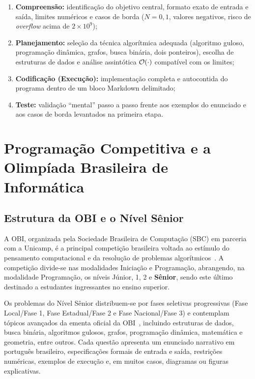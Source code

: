 \begin{enumerate}
    \item \textbf{Compreensão:} identificação do objetivo central, formato exato de entrada e saída, limites numéricos e casos de borda ($N = 0, 1$, valores negativos, risco de \textit{overflow} acima de $2 \times 10^9$);
    \item \textbf{Planejamento:} seleção da técnica algorítmica adequada (algoritmo guloso, programação dinâmica, grafos, busca binária, dois ponteiros), escolha de estruturas de dados e análise assintótica $\mathcal{O}\!\left(\cdot\right)$ compatível com os limites;
    \item \textbf{Codificação (Execução):} implementação completa e autocontida do programa dentro de um bloco Markdown delimitado;
    \item \textbf{Teste:} validação ``mental'' passo a passo frente aos exemplos do enunciado e aos casos de borda levantados na primeira etapa.
\end{enumerate}

\section{Programação Competitiva e a Olimpíada Brasileira de Informática}\label{sec:fund-obi}

\subsection{Estrutura da OBI e o Nível Sênior}\label{sec:fund-obi-senior}

A OBI, organizada pela Sociedade Brasileira de Computação (SBC) em parceria com a Unicamp, é a principal competição brasileira voltada ao estímulo do pensamento computacional e da resolução de problemas algorítmicos~\citep{obi2026}. A competição divide-se nas modalidades Iniciação e Programação, abrangendo, na modalidade Programação, os níveis Júnior, 1, 2 e \textbf{Sênior}, sendo este último destinado a estudantes ingressantes no ensino superior.

Os problemas do Nível Sênior distribuem-se por fases seletivas progressivas (Fase Local/Fase 1, Fase Estadual/Fase 2 e Fase Nacional/Fase 3) e contemplam tópicos avançados da ementa oficial da OBI~\citep{obi_ementa2026}, incluindo estruturas de dados, busca binária, algoritmos gulosos, grafos, programação dinâmica, matemática e geometria, entre outros. Cada questão apresenta um enunciado narrativo em português brasileiro, especificações formais de entrada e saída, restrições numéricas, exemplos de execução e, em muitos casos, diagramas ou figuras explicativas.

